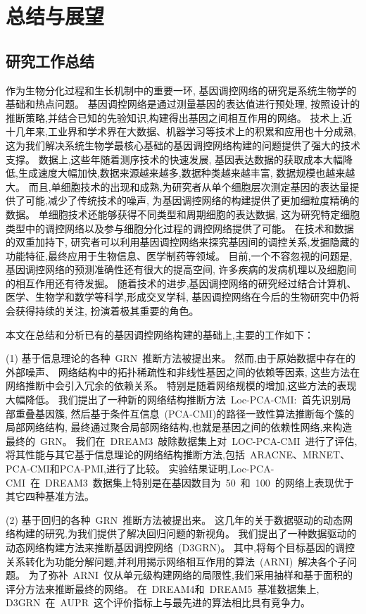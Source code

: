 \section{总结与展望}

\subsection{研究工作总结}

作为生物分化过程和生长机制中的重要一环,
基因调控网络的研究是系统生物学的基础和热点问题。
基因调控网络是通过测量基因的表达值进行预处理,
按照设计的推断策略,并结合已知的先验知识,构建得出基因之间相互作用的网络。
技术上,近十几年来,工业界和学术界在大数据、机器学习等技术上的积累和应用也十分成熟,
这为我们解决系统生物学最核心基础的基因调控网络构建的问题提供了强大的技术支撑。
数据上,这些年随着测序技术的快速发展,
基因表达数据的获取成本大幅降低,生成速度大幅加快,数据来源越来越多,数据种类越来越丰富, 数据规模也越来越大。
而且,单细胞技术的出现和成熟,为研究者从单个细胞层次测定基因的表达量提供了可能,减少了传统技术的噪声,
为基因调控网络的构建提供了更加细粒度精确的数据。
单细胞技术还能够获得不同类型和周期细胞的表达数据,
这为研究特定细胞类型中的调控网络以及参与细胞分化过程的调控网络提供了可能。
在技术和数据的双重加持下,
研究者可以利用基因调控网络来探究基因间的调控关系,发掘隐藏的功能特征,最终应用于生物信息、医学制药等领域。
目前,一个不容忽视的问题是,基因调控网络的预测准确性还有很大的提高空间,
许多疾病的发病机理以及细胞间的相互作用还有待发掘。
随着技术的进步,基因调控网络的研究经过结合计算机、医学、生物学和数学等科学,形成交叉学科,
基因调控网络在今后的生物研究中仍将会获得持续的关注, 扮演着极其重要的角色。

本文在总结和分析已有的基因调控网络构建的基础上,主要的工作如下：

(1) 基于信息理论的各种~GRN~推断方法被提出来。
然而,由于原始数据中存在的外部噪声、
网络结构中的拓扑稀疏性和非线性基因之间的依赖等因素,
这些方法在网络推断中会引入冗余的依赖关系。
特别是随着网络规模的增加,这些方法的表现大幅降低。
我们提出了一种新的网络结构推断方法~Loc-PCA-CMI:~首先识别局部重叠基因簇,
然后基于条件互信息~(PCA-CMI)的路径一致性算法推断每个簇的局部网络结构,
最终通过聚合局部网络结构,也就是基因之间的依赖性网络,来构造最终的~GRN。
我们在~DREAM3~敲除数据集上对~LOC-PCA-CMI~进行了评估,
将其性能与其它基于信息理论的网络结构推断方法,包括~ARACNE、MRNET、PCA-CMI和PCA-PMI,进行了比较。
实验结果证明,Loc-PCA-CMI~在~DREAM3~数据集上特别是在基因数目为~50~和~100~的网络上表现优于其它四种基准方法。

(2) 基于回归的各种~GRN~推断方法被提出来。
这几年的关于数据驱动的动态网络构建的研究,为我们提供了解决回归问题的新视角。
我们提出了一种数据驱动的动态网络构建方法来推断基因调控网络~(D3GRN)。
其中,将每个目标基因的调控关系转化为功能分解问题,并利用揭示网络相互作用的算法~(ARNI)~解决各个子问题。
为了弥补~ARNI~仅从单元级构建网络的局限性,我们采用抽样和基于面积的评分方法来推断最终的网络。
在~DREAM4和~DREAM5~基准数据集上, D3GRN~在~AUPR~这个评价指标上与最先进的算法相比具有竞争力。

